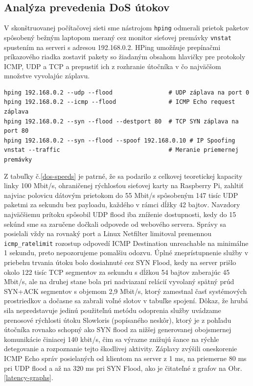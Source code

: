 \documentclass[12pt, a4paper]{article}
\begin{document}
\subsection{Analýza prevedenia DoS útokov}
V skonštruovanej počítačovej sieti sme nástrojom \verb|hping| odmerali prietok paketov spôsobený
bežným laptopom meraný cez monitor sieťovej premávky \verb|vnstat| spustením na serveri s adresou 
192.168.0.2. HPing umožňuje prepínačmi príkazového riadka zostaviť pakety so žiadaným obsahom hlavičky pre 
protokoly  ICMP, UDP a TCP a prepustiť ich z rozhranie útočníka v čo najväčšom množstve vyvolajúc záplavu.
\begin{lstlisting}[caption=Príkazy na spustenie záplavových útokov a meranie]
hping 192.168.0.2 --udp --flood                # UDP záplava na port 0
hping 192.168.0.2 --icmp --flood               # ICMP Echo request záplava
hping 192.168.0.2 --syn --flood --destport 80  # TCP SYN záplava na port 80
hping 192.168.0.2 --syn --flood --spoof 192.168.0.10 # IP Spoofing
vnstat --traffic                               # Meranie priemernej premávky
\end{lstlisting}

Z tabuľky č.\ref{dos-speeds} je patrné, že sa podarilo z celkovej teoretickej kapacity linky 100 Mbit/s,
ohraničenej rýchlosťou sieťovej karty na Raspberry Pi, zahltiť najviac polovicu dátovým prietokom 
do 55 Mbit/s spôsobeným 147 tisíc UDP paketmi za sekundu bez payloadu, každého v rámci dĺžky 42 bajtov. Navzdory najväčšiemu prítoku spôsobil UDP flood iba zníženie dostupnosti, kedy do 15 sekúnd sme sa zaručene 
dočkali odpovede od webového servera.
Správy sa posielali vždy na rovnaký port a Linux Netfilter limitoval premennou \verb|icmp_ratelimit|
rozostup odpovedí ICMP Destination unreachable na minimálne 1 sekundu, preto nepozorujeme
pomalšiu odozvu. Úplné zneprístupnenie služby v priebehu trvania útoku bolo dosiahnuté cez SYN Flood,
kedy na server prišlo okolo 122 tisíc TCP segmentov za sekundu s dĺžkou 54 bajtov zaberajúc
45 Mbit/s, ale na druhej stane bola pri nadviazaní relácií vyvolaný spätný prúd SYN+ACK segmentov s objemom
2,9 Mbit/s, ktorý zamestnal časť systémových prostriedkov a dočasne sa zabrali voľné slotov v tabuľke spojení. 
Dôkaz, že hrubá sila nepredstavuje jedinú použiteľnú metódu odoprenia služby uvádzame prenosové rýchlosti 
útoku Slowloris (popísaného neskôr), ktorý je z pohľadu  útočníka rovnako schopný ako SYN flood za nižšej 
generovanej obojsmernej komunikácie činiacej 140 kbit/s, čim sa výrazne znižujú šance na rýchle detegovanie a 
rozpoznanie tejto škodlivej aktivity. Záplavy zvýšili oneskorenie ICMP Echo správ posielaných od klientom na 
server z 1 ms, na priemerne 80 ms pri UDP flood a až na 320 ms pri SYN Flood, ako je čitateľné z grafov na 
Obr.\ref{latency-graphs}.
\end{document}
